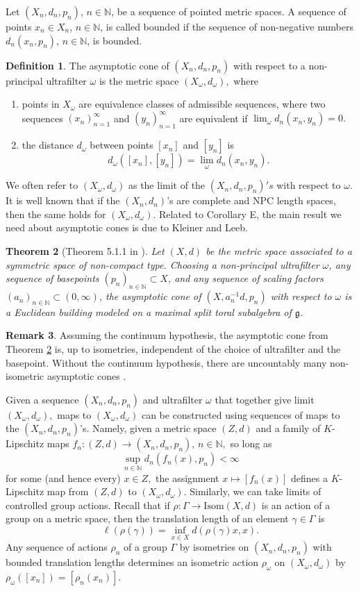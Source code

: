 \documentclass[10pt]{amsart}
\newcommand{\g}{\mathfrak{g}}
\newtheorem{thm}{Theorem}[section]
\theoremstyle{definition}
\newtheorem{defn}[thm]{Definition}
\newtheorem{remark}[thm]{Remark}
\begin{document}
Let $(X_n,d_n,p_n)$, $n\in \mathbb{N}$, be a sequence of pointed metric spaces. A sequence of points $x_n\in X_n$, $n\in\mathbb{N}$, is called bounded if the sequence of non-negative numbers $d_n(x_n,p_n)$, $n\in \mathbb{N}$, is bounded.
\begin{defn}
    The asymptotic cone of $(X_n,d_n,p_n)$ with respect to a non-principal ultrafilter $\omega$ is the metric space $(X_\omega, d_\omega),$ where
    \begin{enumerate}
        \item points in $X_\omega$ are equivalence classes of admissible sequences, where two sequences $(x_n)_{n=1}^\infty$ and $(y_n)_{n=1}^\infty$ are equivalent if $\lim_\omega d_n(x_n,y_n)=0.$
        \item the distance $d_\omega$ between points $[x_n]$ and $[y_n]$ is $$d_\omega([x_n],[y_n])=\lim_\omega d_n(x_n,y_n).$$
    \end{enumerate}
\end{defn}
We often refer to $(X_\omega,d_\omega)$ as the limit of the $(X_n,d_n,p_n)'s$ with respect to $\omega$. It is well known that if the $(X_n,d_n)$'s are complete and NPC length spaces, then the same holds for $(X_\omega,d_\omega)$. Related to Corollary E, the main result we need about asymptotic cones is due to Kleiner and Leeb.
\begin{thm}[Theorem 5.1.1 in \cite{KL}]\label{thm: KL}
Let $(X,d)$ be the metric space associated to a symmetric space of non-compact type. Choosing a non-principal ultrafilter $\omega$, any sequence of basepoints $(p_n)_{n\in\mathbb{N}}\subset X$, and any sequence of scaling factors $(a_n)_{n\in \mathbb{N}}\subset (0,\infty)$, the asymptotic cone of $(X,a_n^{-1}d,p_n)$ with respect to $\omega$ is a Euclidean building modeled on a maximal split toral subalgebra of $\g$.
\end{thm}
\begin{remark}
    Assuming the continuum hypothesis, the asymptotic cone from Theorem \ref{thm: KL} is, up to isometries, independent of the choice of ultrafilter and the basepoint. Without the continuum hypothesis, there are uncountably many non-isometric asymptotic cones \cite{Tho}. 
\end{remark}
Given a sequence $(X_n,d_n,p_n)$ and ultrafilter $\omega$ that together give limit $(X_\omega,d_\omega),$ maps to $(X_\omega,d_\omega)$ can be constructed using sequences of maps to the $(X_n,d_n,p_n)$'s. Namely, given a metric space $(Z,d)$ and a family of $K$-Lipschitz maps $f_n: (Z,d)\to (X_n,d_n,p_n)$, $n\in \mathbb{N},$ so long as $$\sup_{n\in \mathbb{N}}d_n(f_n(x),p_n)<\infty$$ for some (and hence every) $x\in Z,$ the assignment $x\mapsto [f_n(x)]$ defines a $K$-Lipschitz map from $(Z,d)$ to $(X_\omega,d_\omega).$ Similarly, we can take limits of controlled group actions. Recall that if $\rho:\Gamma\to \textrm{Isom}(X,d)$ is an action of a group on a metric space, then the translation length of an element $\gamma\in \Gamma$ is $$\ell(\rho(\gamma))=\inf_{x\in X}d(\rho(\gamma)x,x).$$
Any sequence of actions $\rho_n$ of a group $\Gamma$ by isometries on $(X_n,d_n,p_n)$ with bounded translation lengths determines an isometric action $\rho_\omega$ on $(X_\omega,d_\omega)$ by $\rho_\omega ([x_n]) = [\rho_n(x_n)]$. 
\end{document}
